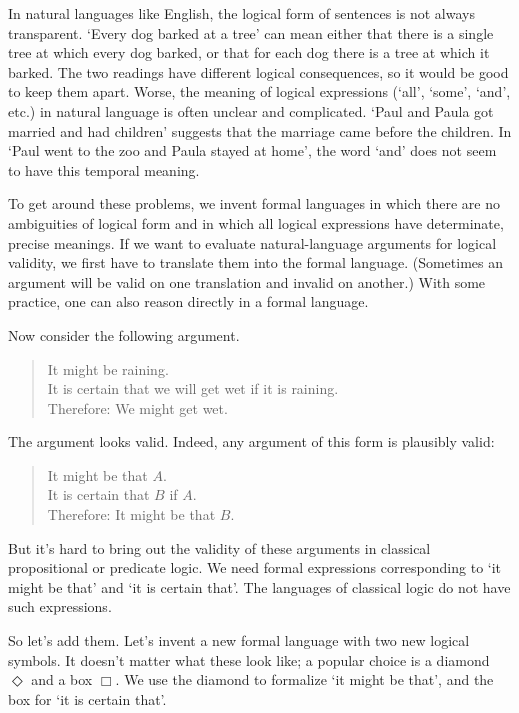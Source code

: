 In natural languages like English, the logical form of sentences is not always
transparent. `Every dog barked at a tree' can mean either that there is a single
tree at which every dog barked, or that for each dog there is a tree at which it
barked. The two readings have different logical consequences, so it would be
good to keep them apart. Worse, the meaning of logical expressions (`all',
`some', `and', etc.) in natural language is often unclear and complicated. `Paul
and Paula got married and had children' suggests that the marriage came before
the children. In `Paul went to the zoo and Paula stayed at home', the word `and'
does not seem to have this temporal meaning.

To get around these problems, we invent formal languages in which there are no
ambiguities of logical form and in which all logical expressions have
determinate, precise meanings. If we want to evaluate natural-language arguments
for logical validity, we first have to translate them into the formal language.
(Sometimes an argument will be valid on one translation and invalid on another.)
With some practice, one can also reason directly in a formal language.


Now consider the following argument.
%
\begin{quote}
  It might be raining.\\
  It is certain that we will  get wet if it is raining.\\
  Therefore: We might get wet.
\end{quote}
%
The argument looks valid. Indeed, any argument of this form is plausibly valid:
\begin{quote}
  It might be that $A$.\\
  It is certain that $B$ if $A$.\\
  Therefore: It might be that $B$.
\end{quote}
But it's hard to bring out the validity of these arguments in classical
propositional or predicate logic. We need formal expressions corresponding to
`it might be that' and `it is certain that'. The languages of classical
logic do not have such expressions.


So let's add them. Let's invent a new formal language with two new logical
symbols. It doesn't matter what these look like; a popular choice is a
diamond $\Diamond$ and a box $\Box$. We use the diamond to formalize `it might be
that', and the box for `it is certain that'.

